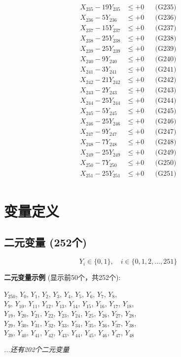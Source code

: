 \documentclass[a4paper,10pt]{article}
\begin{document}
{\begin{align}
X_{235} - 19Y_{235} &\leq +0 && \text{(G235)} \\
X_{236} - 5Y_{236} &\leq +0 && \text{(G236)} \\
X_{237} - 15Y_{237} &\leq +0 && \text{(G237)} \\
\allowbreak
X_{238} - 25Y_{238} &\leq +0 && \text{(G238)} \\
X_{239} - 25Y_{239} &\leq +0 && \text{(G239)} \\
X_{240} - 9Y_{240} &\leq +0 && \text{(G240)} \\
X_{241} - 3Y_{241} &\leq +0 && \text{(G241)} \\
X_{242} - 21Y_{242} &\leq +0 && \text{(G242)} \\
X_{243} - 2Y_{243} &\leq +0 && \text{(G243)} \\
X_{244} - 25Y_{244} &\leq +0 && \text{(G244)} \\
X_{245} - 5Y_{245} &\leq +0 && \text{(G245)} \\
X_{246} - 25Y_{246} &\leq +0 && \text{(G246)} \\
X_{247} - 9Y_{247} &\leq +0 && \text{(G247)} \\
\allowbreak
X_{248} - 7Y_{248} &\leq +0 && \text{(G248)} \\
X_{249} - 25Y_{249} &\leq +0 && \text{(G249)} \\
X_{250} - 7Y_{250} &\leq +0 && \text{(G250)} \\
X_{251} - 25Y_{251} &\leq +0 && \text{(G251)} \\
\end{align}
}

\section{变量定义}

\subsection{二元变量 (252个)}

\begin{equation}
Y_i \in \{0,1\}, \quad i \in \{0, 1, 2, \ldots, 251\}
\end{equation}

\textbf{二元变量示例} (显示前50个，共252个):

{\small
$Y_{250}$, $Y_{0}$, $Y_{1}$, $Y_{2}$, $Y_{3}$, $Y_{4}$, $Y_{5}$, $Y_{6}$, $Y_{7}$, $Y_{8}$, \\
$Y_{9}$, $Y_{10}$, $Y_{11}$, $Y_{12}$, $Y_{13}$, $Y_{14}$, $Y_{15}$, $Y_{16}$, $Y_{17}$, $Y_{18}$, \\
$Y_{19}$, $Y_{20}$, $Y_{21}$, $Y_{22}$, $Y_{23}$, $Y_{24}$, $Y_{25}$, $Y_{26}$, $Y_{27}$, $Y_{28}$, \\
$Y_{29}$, $Y_{30}$, $Y_{31}$, $Y_{32}$, $Y_{33}$, $Y_{34}$, $Y_{35}$, $Y_{36}$, $Y_{37}$, $Y_{38}$, \\
$Y_{39}$, $Y_{40}$, $Y_{41}$, $Y_{42}$, $Y_{43}$, $Y_{44}$, $Y_{45}$, $Y_{46}$, $Y_{47}$, $Y_{48}$

\textit{...还有202个二元变量}
}
\end{document}
